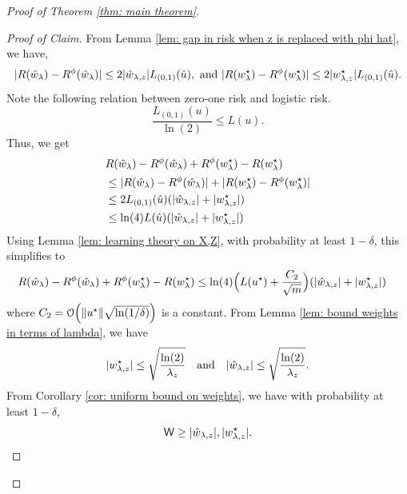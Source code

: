 \begin{proof}[Proof of Theorem \ref{thm: main theorem}]
    \begin{proof}[Proof of Claim]
        From Lemma \ref{lem: gap in risk when z is replaced with phi hat}, we have,
        \begin{equation*}
            |R(\hat{w}_\lambda) - R^\phi(\hat{w}_\lambda)|
            \leq 2|\hat{w}_{\lambda,z}|L_{(0,1)}(\hat{u}),\textrm{ and }
            |R(w^\star_{\lambda}) - R^\phi(w^\star_{\lambda})|
            \leq 2|w^\star_{{\lambda,z}}|L_{(0,1)}(\hat{u}).
        \end{equation*}
        Note the following relation between zero-one risk and logistic risk. 
\begin{equation*}
    \frac{L_{(0,1)}(u)}{\ln(2)} \leq L(u).
\end{equation*}
        Thus, we get
        \begin{equation*}
            \begin{aligned}
                  & R(\hat{w}_\lambda) - R^\phi(\hat{w}_\lambda) + R^\phi(w^\star_{\lambda}) - R(w^\star_{\lambda}) \\
                  &\leq |R(\hat{w}_\lambda) - R^\phi(\hat{w}_\lambda)| + |R(w^\star_{\lambda}) - R^\phi(w^\star_{\lambda})|\\
                  &\leq 2L_{(0,1)}(\hat{u})(|\hat{w}_{\lambda,z}| + |w^\star_{{\lambda,z}}|) \\
                  &\leq \ln(4)L(\hat{u})(|\hat{w}_{\lambda,z}| + |w^\star_{{\lambda,z}}|)
            \end{aligned}
        \end{equation*}
Using Lemma \ref{lem: learning theory on X,Z}, with probability at least $1-\delta$, this simplifies to
        \begin{equation*}
            \begin{aligned}
                R(\hat{w}_\lambda) - R^\phi(\hat{w}_\lambda) + R^\phi(w^\star_{\lambda}) - R(w^\star_{\lambda})
                &\leq \ln(4)\Big(L(u^\star) + \frac{C_2}{\sqrt{m}}\Big)(|\hat{w}_{\lambda,z}| + |w^\star_{{\lambda,z}}|)
            \end{aligned}
        \end{equation*}
        where $C_2 = \mathcal{O}\Big(\|u^\star\|\sqrt{\ln(1/\delta)}\Big)$ is a constant.
        From Lemma \ref{lem: bound weights in terms of lambda}, we have
        \begin{equation*}
            |w^\star_{{\lambda,z}}| \leq \sqrt{\frac{\ln(2)}{\lambda_z}}
            \quad \text{and} \quad
            |\hat{w}_{\lambda,z}| \leq  \sqrt{\frac{\ln(2)}{\lambda_z}}.
        \end{equation*}
        From Corollary \ref{cor: uniform bound on weights}, we have with probability at least $1-\delta$,
        \begin{equation*}
            \mathsf{W} \geq |\hat{w}_{\lambda,z}|, |w^\star_{{\lambda,z}}|.
        \end{equation*}

\end{proof}
\end{proof}
